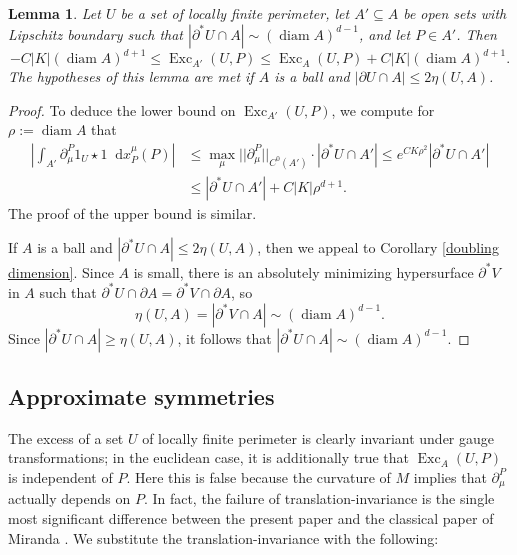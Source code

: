 \documentclass[reqno,10pt]{amsart}
\DeclareMathOperator{\diam}{diam}
\DeclareMathOperator{\Exc}{Exc}
\newcommand*\dif{\mathop{}\!\mathrm{d}}
\newtheorem{lemma}[theorem]{Lemma}
\theoremstyle{definition}
\numberwithin{equation}{section}
\begin{document}
\begin{lemma}
Let $U$ be a set of locally finite perimeter, let $A' \subseteq A$ be open sets with Lipschitz boundary such that $|\partial^* U \cap A| \sim (\diam A)^{d - 1}$,
and let $P \in A'$. Then
\begin{equation}\label{approximate monotone}
-C |K| (\diam A)^{d + 1} \leq \Exc_{A'}(U, P) \leq \Exc_A(U, P) + C |K|(\diam A)^{d + 1}.
\end{equation}
The hypotheses of this lemma are met if $A$ is a ball and $|\partial U \cap A| \leq 2\eta(U, A)$.
\end{lemma}
\begin{proof}
To deduce the lower bound on $\Exc_{A'}(U, P)$, we compute for $\rho := \diam A$ that
\begin{align*}
    \left|\int_{A'} \partial^P_\mu 1_U \star 1 \dif x_P^\mu(P)\right|
 & \leq \max_\mu ||\partial^P_\mu||_{C^0(A')} \cdot |\partial^* U \cap A'| \leq e^{CK\rho^2} |\partial^* U \cap A'| \\
 & \leq |\partial^* U \cap A'| + C|K|\rho^{d + 1}.
\end{align*}
The proof of the upper bound is similar.

If $A$ is a ball and $|\partial^* U \cap A| \leq 2\eta(U, A)$, then we appeal to Corollary \ref{doubling dimension}.
Since $A$ is small, there is an absolutely minimizing hypersurface $\partial^* V$ in $A$ such that $\partial^* U \cap \partial A = \partial^* V \cap \partial A$, so
$$\eta(U, A) = |\partial^* V \cap A| \sim (\diam A)^{d - 1}.$$
Since $|\partial^* U \cap A| \geq \eta(U, A)$, it follows that $|\partial^* U \cap A| \sim (\diam A)^{d - 1}$.
\end{proof}


\subsection{Approximate symmetries} \label{translation appendix}
The excess of a set $U$ of locally finite perimeter is clearly invariant under gauge transformations; in the euclidean case, it is additionally true that $\Exc_A(U, P)$ is independent of $P$.
Here this is false because the curvature of $M$ implies that $\partial_\mu^P$ actually depends on $P$.
In fact, the failure of translation-invariance is the single most significant difference between the present paper and the classical paper of Miranda \cite{Miranda66}.
We substitute the translation-invariance with the following:
\end{document}
